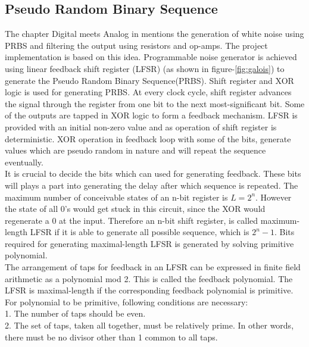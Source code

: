 \documentclass[a4paper,12pt]{article}
\begin{document}
\subsection{Pseudo Random Binary Sequence}  
The chapter Digital meets Analog in \cite{aoe} mentions the generation of white noise using PRBS and filtering the output using resistors and op-amps. The project implementation is based on this idea. Programmable noise generator is achieved using linear feedback shift register (LFSR) (as shown in figure-\ref{fig:galois}) to generate the Pseudo Random Binary Sequence(PRBS). Shift register and XOR logic is used for generating PRBS\cite{lfsr_ti}. At every clock cycle, shift register advances the signal through the register from one bit to the next most-significant bit. Some of the outputs are tapped in XOR logic to form a feedback mechanism. LFSR is provided with an initial non-zero value and as operation of shift register is deterministic. XOR operation in feedback loop with some of the bits, generate values which are pseudo random in nature and will repeat the sequence eventually. \\
It is crucial to decide the bits which can used for generating feedback. These bits will plays a part into generating the delay after which sequence is repeated. The maximum number of conceivable states of an n-bit register is $L = 2^n$. However the state of all 0’s would get stuck in this circuit, since the XOR would regenerate a 0 at the input. Therefore an n-bit shift register, is called maximum-length LFSR if it is able to generate all possible sequence, which is $2^n-1$. Bits required for generating maximal-length LFSR is generated by solving primitive polynomial. \\
The arrangement of taps for feedback in an LFSR can be expressed in finite field arithmetic as a polynomial mod 2. This is called the feedback polynomial. The LFSR is maximal-length if the corresponding feedback polynomial is primitive. For polynomial to be primitive, following conditions are necessary:\\
1. The number of taps should be even.\\
2. The set of taps, taken all together, must be relatively prime. In other words, there must be no divisor other than 1 common to all taps.
\end{document}
